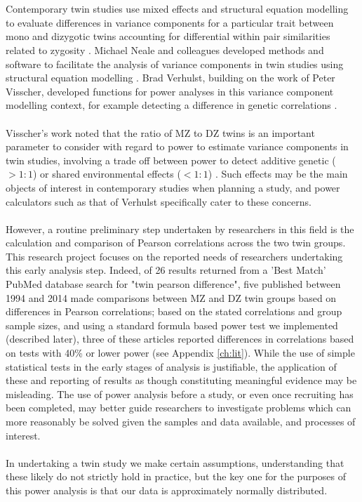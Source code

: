 \\
\\
Contemporary twin studies use mixed effects and structural equation modelling to evaluate differences in variance components for a particular trait between mono and dizygotic twins accounting for differential within pair similarities related to zygosity \cite{Neale1992,Carlin2005}.  Michael Neale and colleagues developed methods and software to facilitate the analysis of variance components in twin studies using structural equation modelling \cite{Neale1992}.  Brad Verhulst, building on the work of Peter Visscher, developed functions for power analyses in this variance component modelling context, for example detecting a difference in genetic correlations \cite{Verhulst2017,Visscher2004,Visscher2008a}. 
\\
\\
Visscher's work noted that the ratio of MZ to DZ twins is an important parameter to consider with regard to power to estimate variance components in twin studies, involving a trade off between power to detect additive genetic ($>1:1$) or shared environmental effects ($<1:1$) \cite{Visscher2008a}.  Such effects may be the main objects of interest in contemporary studies when planning a study, and power calculators such as that of Verhulst \cite{Verhulst2017} specifically cater to these concerns.  
\\
\\
However, a routine preliminary step undertaken by researchers in this field is the calculation and comparison of Pearson correlations across the two twin groups.  This research project focuses on the reported needs of researchers undertaking this early analysis step.  Indeed, of 26 results returned from a 'Best Match' PubMed database search for "twin pearson difference", five published between 1994 and 2014 made comparisons between MZ and DZ twin groups based on differences in Pearson correlations; based on the stated correlations and group sample sizes, and using a standard formula based power test we implemented (described later), three of these articles reported differences in correlations based on tests with 40\% or lower power (see Appendix \ref{ch:lit}).  While the use of simple statistical tests in the early stages of analysis is justifiable, the application of these and reporting of results as though constituting meaningful evidence may be misleading.  The use of power analysis before a study, or even once recruiting has been completed, may better guide researchers to investigate problems which can more reasonably be solved given the samples and data available, and processes of interest.
\\
\\
In undertaking a twin study we make certain assumptions, understanding that these likely do not strictly hold in practice, but the key one for the purposes of this power analysis is that our data is approximately normally distributed.

